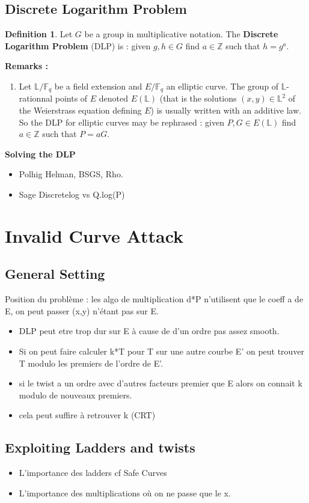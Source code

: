 \documentclass[10pt]{article}
\theoremstyle{definition}
\newtheorem{definition}{Definition}
\newcommand{\F}{\mathbb{F}}
\renewcommand{\L}{\mathbb{L}}
\newcommand{\Z}{\mathbb{Z}}
\begin{document}
\subsection{Discrete Logarithm Problem}

\begin{definition}
Let $G$ be a group in multiplicative notation.
The \textbf{Discrete Logarithm Problem} (DLP) is : given $g,h \in G$ find $a \in \Z$ such that $h = g^a$.
\end{definition}

\noindent \textbf{Remarks :}
\begin{enumerate}
\item Let $\L/\F_q$ be a field extension and $E/\F_q$ an elliptic curve.
The group of $\L$-rationnal points of $E$ denoted $E(\L)$ (that is the solutions $(x,y) \in \L^2$ of the Weierstrass equation defining $E$) is usually written with an additive law. 
So the DLP for elliptic curves may be rephrased : given $P,G \in E(\L)$ find $a \in \Z$ such that $P = aG$.
\end{enumerate}

\textbf{Solving the DLP}
\begin{itemize}
\item Polhig Helman, BSGS, Rho.
\item Sage Discretelog vs Q.log(P)
\end{itemize}


\section{Invalid Curve Attack}
\subsection{General Setting}
Position du problème : les algo de multiplication d*P n'utilisent que le coeff a de E, on peut passer (x,y) n'étant pas sur E.

\begin{itemize}
\item DLP peut etre trop dur sur E à cause de d'un ordre pas assez smooth.
\item Si on peut faire calculer k*T pour T sur une autre courbe E' on peut trouver T modulo les premiers de l'ordre de E'.
\item si le twist a un ordre avec d'autres facteurs premier que E alors on connait k modulo de nouveaux premiers. 
\item cela peut suffire à retrouver k (CRT)
\end{itemize}

\subsection{Exploiting Ladders and twists}
\begin{itemize}
\item L'importance des ladders cf Safe Curves
\item L'importance des multiplications où on ne passe que le x.
\end{itemize}




\end{document}
